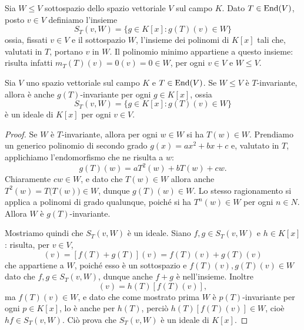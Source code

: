 Sia $W \leq V$ sottospazio dello spazio vettoriale $V$ sul campo $K$.
Dato $T\in\operatorname{End}(V)$, posto $v\in V$ definiamo l'insieme
\begin{equation*}
	S_T(v, W)= \{ g\in K[x]\colon g(T)(v)\in W\}
\end{equation*}
ossia, fissati $v\in V$ e il sottospazio $W$, l'insieme dei polinomi di $K[x]$ tali che, valutati in $T$, portano $v$ in $W$.
Il polinomio minimo appartiene a questo insieme: risulta infatti $m_T(T)(v)=0(v)=0\in W$, per ogni $v\in V$ e $W\le V$.

\begin{lemma} \label{l:ideale-conducente}
	Sia $V$ uno spazio vettoriale sul campo $K$ e $T\in\operatorname{End}(V)$.
	Se $W\le V$ è $T$-invariante, allora è anche $g(T)$-invariante per ogni $g\in K[x]$, ossia
	\begin{equation*}
		S_T(v,W)=\{g\in K[x]\colon g(T)(v)\in W\}
	\end{equation*}
	è un ideale di $K[x]$ per ogni $v\in V$.
\end{lemma}
\begin{proof}
	Se $W$ è $T$-invariante, allora per ogni $w\in W$ si ha $T(w)\in W$.
	Prendiamo un generico polinomio di secondo grado $g(x)=ax^2+bx+c$ e, valutato in $T$, applichiamo l'endomorfismo che ne risulta a $w$:
	\begin{equation}
		g(T)(w)=aT^2(w)+bT(w)+cw.
	\end{equation}
	Chiaramente $cw\in W$, e dato che $T(w)\in W$ allora anche $T^2(w)=T\big(T(w)\big)\in W$, dunque $g(T)(w)\in W$.
	Lo stesso ragionamento si applica a polinomi di grado qualunque, poich\'e si ha $T^n(w)\in W$ per ogni $n\in N$.
	Allora $W$ è $g(T)$-invariante.

	Mostriamo quindi che $S_T(v,W)$ è un ideale.
	Siano $f,g\in S_T(v,W)$ e $h\in K[x]$: risulta, per $v\in V$,
	\begin{equation}
		[(f+g)(T)](v)=[f(T)+g(T)](v)=f(T)(v)+g(T)(v)
	\end{equation}
	che appartiene a $W$, poich\'e esso è un sottospazio e $f(T)(v),g(T)(v)\in W$ dato che $f,g\in S_T(v,W)$, dunque anche $f+g$ è nell'insieme.
	Inoltre
	\begin{equation*}
		[(hf)(T)](v)=h(T)[f(T)(v)],
	\end{equation*}
	ma $f(T)(v)\in W$, e dato che come mostrato prima $W$ è $p(T)$-invariante per ogni $p\in K[x]$, lo è anche per $h(T)$, perciò $h(T)[f(T)(v)]\in W$, cioè $hf\in S_T(v,W)$.
	Ciò prova che $S_T(v,W)$ è un ideale di $K[x]$.
\end{proof}

